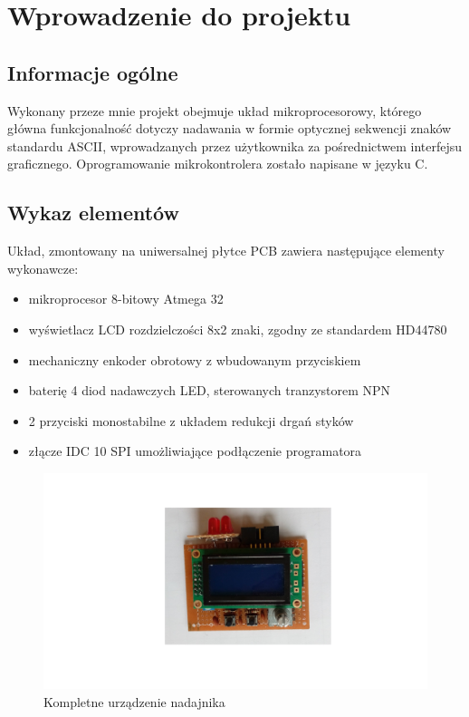 \documentclass{article}
\begin{document}

  \newpage
{}  

\section{Wprowadzenie do projektu}
\subsection{Informacje ogólne}
Wykonany przeze mnie projekt obejmuje układ mikroprocesorowy, którego główna funkcjonalność dotyczy nadawania w formie optycznej sekwencji znaków standardu ASCII, wprowadzanych przez użytkownika za pośrednictwem interfejsu graficznego. Oprogramowanie mikrokontrolera zostało napisane w języku C.
\subsection{Wykaz elementów}
Układ, zmontowany na uniwersalnej płytce PCB zawiera następujące elementy wykonawcze:

\begin{itemize}
	\item	mikroprocesor 8-bitowy Atmega 32

	\item	wyświetlacz LCD rozdzielczości 8x2 znaki, zgodny ze standardem HD44780

	\item	mechaniczny enkoder obrotowy z wbudowanym przyciskiem

	\item	baterię 4 diod nadawczych LED, sterowanych tranzystorem NPN

	\item	2 przyciski monostabilne z układem redukcji drgań styków

	\item 	złącze IDC 10 SPI umożliwiające podłączenie programatora
\end{itemize}

\begin{figure}[h!]
	\includegraphics[width=\textwidth]{img/morse_main_view.png}
	\caption{Kompletne urządzenie nadajnika}
	\label{fig:zdjecie1}
\end{figure}
\end{document}
